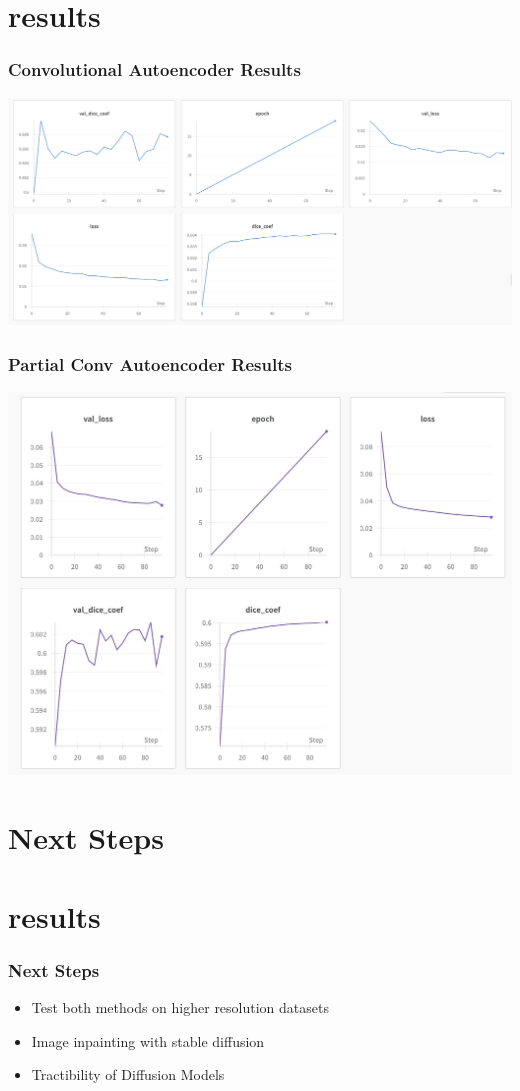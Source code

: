 \documentclass{beamer}
\begin{document}
\section{results}
\begin{frame}
	\frametitle{Convolutional Autoencoder Results}
	\begin{center}
		\includegraphics[scale=0.25]{result1.png}
	\end{center}
\end{frame}

\begin{frame}
	\frametitle{Partial Conv Autoencoder Results}
	\begin{center}
		\includegraphics[scale=0.3]{results2.jpg}
	\end{center}
\end{frame}

\section{Next Steps}
\section{results}
\begin{frame}
	\frametitle{Next Steps}
	\begin{itemize}
		\item Test both methods on higher resolution datasets
		\item Image inpainting with stable diffusion
		\item Tractibility of Diffusion Models
	\end{itemize}
\end{frame}
\end{document}
